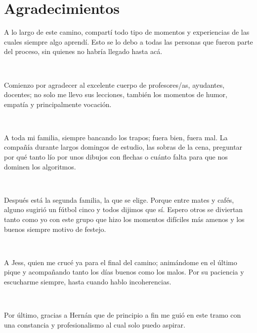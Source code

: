 \chapter*{Agradecimientos}

\noindent A lo largo de este camino, compartí todo tipo de momentos y
experiencias de las cuales siempre algo aprendí. Esto se lo debo a todas las
personas que fueron parte del proceso, sin quienes no habría llegado hasta acá.

~

\noindent Comienzo por agradecer al excelente cuerpo de profesores/as,
ayudantes, docentes; no solo me llevo sus lecciones, también los momentos de
humor, empatía y principalmente vocación.

~

\noindent A toda mi familia, siempre bancando los trapos; fuera bien, fuera mal. La
compañía durante largos domingos de estudio, las sobras de la cena, preguntar
por qué tanto lío por unos dibujos con flechas o cuánto falta para que nos
dominen los algoritmos.

~

\noindent Después está la segunda familia, la que se elige. Porque entre mates
y cafés, alguno sugirió un fútbol cinco y todos dijimos que sí. Espero otros se
diviertan tanto como yo con este grupo que hizo los momentos difíciles más
amenos y los buenos siempre motivo de festejo.

~

\noindent A Jess, quien me crucé ya para el final del camino; animándome en el
último pique y acompañando tanto los días buenos como los malos. Por su
paciencia y escucharme siempre, hasta cuando hablo incoherencias.

~

\noindent Por último, gracias a Hernán que de principio a fin me guió en este
tramo con una constancia y profesionalismo al cual solo puedo aspirar.
